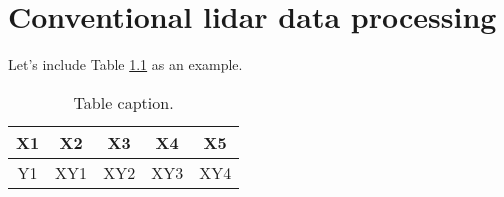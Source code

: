 \chapter{Conventional lidar data processing}
\label{sect:devs02_chapter2}

Let's include Table \ref{tab::table01} as an example.

\begin{table}[h]     
	\caption{Table caption.}
	\label{tab::table01}
	\footnotesize
	\begin{center}
		\begin{tabular}{ccccc}
			\toprule
			X1 & X2 & X3 & X4 & X5\\
			\midrule
            Y1 & XY1 & XY2 & XY3 & XY4\\
			\bottomrule
		\end{tabular}
	\end{center}
\end{table}